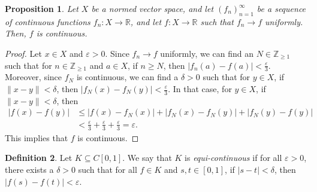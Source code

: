 \documentclass[a4paper, openany]{memoir}
\theoremstyle{definition}
\newtheorem{definition}{Definition}[section]
\theoremstyle{plain}
\newtheorem{proposition}[definition]{Proposition}
\begin{document}
\begin{proposition}
    Let $X$ be a normed vector space, and let $(f_n)_{n=1}^\infty$ be a sequence of continuous functions $f_n: X \to \mathbb{R}$, and let $f: X \to \mathbb{R}$ such that $f_n \to f$ uniformly. Then, $f$ is continuous.
\end{proposition}
\begin{proof}
    Let $x \in X$ and $\varepsilon > 0$. Since $f_n \to f$ uniformly, we can find an $N \in \mathbb{Z}_{\geq 1}$ such that for $n \in \mathbb{Z}_{\geq 1}$ and $a \in X$, if $n \geq N$, then $|f_n(a) - f(a)| < \frac{\varepsilon}{3}$. Moreover, since $f_N$ is continuous, we can find a $\delta > 0$ such that for $y \in X$, if $\lVert x - y \rVert < \delta$, then $|f_N(x) - f_N(y)| < \frac{\varepsilon}{3}$. In that case, for $y \in X$, if $\lVert x - y \rVert < \delta$, then
    \begin{align*}
        |f(x) - f(y)| &\leq |f(x) - f_N(x)| + |f_N(x) - f_N(y)| + |f_N(y) - f(y)| \\
        &< \frac{\varepsilon}{3} + \frac{\varepsilon}{3} + \frac{\varepsilon}{3} = \varepsilon.
    \end{align*}
    This implies that $f$ is continuous.
\end{proof}


\begin{definition}
    Let $K \subseteq C[0, 1]$. We say that $K$ is \emph{equi-continuous} if for all $\varepsilon > 0$, there exists a $\delta > 0$ such that for all $f \in K$ and $s, t \in [0, 1]$, if $|s - t| < \delta$, then $|f(s) - f(t)| < \varepsilon$.
\end{definition}
\end{document}
